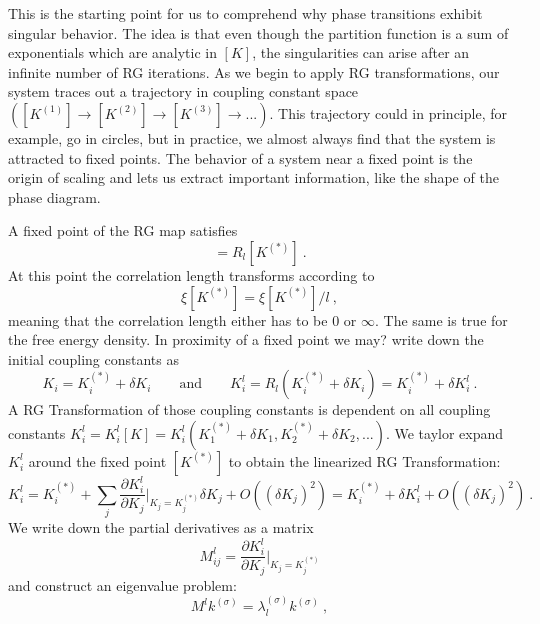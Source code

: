 	This is the starting point for us to comprehend why phase transitions exhibit singular behavior. The idea is that even though the partition function is a sum of exponentials which are analytic in $[K]$, the singularities can arise after an infinite number of RG iterations. As we begin to apply RG transformations, our system traces out a trajectory in coupling constant space $\left([K^{(1)}] \rightarrow [K^{(2)}] \rightarrow [K^{(3)}] \rightarrow ...\right)$. This trajectory could in principle, for example, go in circles, but in practice, we almost always find that the system is attracted to fixed points. The behavior of a system near a fixed point is the origin of scaling and lets us extract important information, like the shape of the phase diagram.
	
	A fixed point of the RG	map satisfies
	\begin{equation}
		[K^{(*)}] =	R_l[K^{(*)}] ~.
	\end{equation}
	At this point the correlation length transforms according to
	\begin{equation}
		\xi[K^{(*)}] =	\xi[K^{(*)}] / l~,		
	\end{equation}
	meaning that the correlation length either has to be $0$ or $\infty$. The same is true for the free energy density. In proximity of a fixed point we may? write down the initial coupling constants as
	\begin{equation}
		K_i =	K_i^{(*)} + \delta K_i \qquad \text{and} \qquad K_i^l =	R_l(K_i^{(*)} + \delta K_i) =	K_i^{(*)} + \delta K_i^l~.
	\end{equation}
	A RG Transformation of those coupling constants is dependent on all coupling constants $K^l_i =	K^l_i[K] =	K^l_i(K_1^{(*)} + \delta K_1, K_2^{(*)} + \delta K_2, ...)$. We taylor expand $K_i^l$ around the fixed point $[K^{(*)}]$ to obtain the linearized RG Transformation:
	\begin{equation} \label{linearized-RG}
		K_i^l =	K_i^{(*)} + \sum_j \frac{\partial K_i^l}{\partial K_j} \bigg |_{K_j = K_j^{(*)}} \delta K_j + O((\delta K_j)^2) = K_i^{(*)} + \delta K_i^l + O((\delta K_j)^2) ~.
	\end{equation}
	We write down the partial derivatives as a matrix
	\begin{equation}
		M^l_{ij} =	\frac{\partial K_i^l}{\partial K_j} \bigg |_{K_j = K_j^{(*)}}
	\end{equation}
	and construct an eigenvalue problem:
	\begin{equation} \label{ev-problem}
		M^l k^{(\sigma)} =	\lambda^{(\sigma)}_l k^{(\sigma)}~,
	\end{equation}
